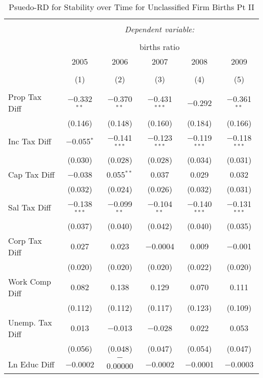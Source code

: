 
\begin{table}[!htbp] \centering 
  \caption{Psuedo-RD for Stability over Time for  Unclassified Firm Births Pt II} 
  \label{99year} 
\small 
\begin{tabular}{@{\extracolsep{5pt}}lccccc} 
\\[-1.8ex]\hline 
\hline \\[-1.8ex] 
 & \multicolumn{5}{c}{\textit{Dependent variable:}} \\ 
\cline{2-6} 
\\[-1.8ex] & \multicolumn{5}{c}{births ratio} \\ 
 & 2005 & 2006 & 2007 & 2008 & 2009 \\ 
\\[-1.8ex] & (1) & (2) & (3) & (4) & (5)\\ 
\hline \\[-1.8ex] 
 Prop Tax Diff & $-$0.332$^{**}$ & $-$0.370$^{**}$ & $-$0.431$^{***}$ & $-$0.292 & $-$0.361$^{**}$ \\ 
  & (0.146) & (0.148) & (0.160) & (0.184) & (0.166) \\ 
  Inc Tax Diff & $-$0.055$^{*}$ & $-$0.141$^{***}$ & $-$0.123$^{***}$ & $-$0.119$^{***}$ & $-$0.118$^{***}$ \\ 
  & (0.030) & (0.028) & (0.028) & (0.034) & (0.031) \\ 
  Cap Tax Diff & $-$0.038 & 0.055$^{**}$ & 0.037 & 0.029 & 0.032 \\ 
  & (0.032) & (0.024) & (0.026) & (0.032) & (0.031) \\ 
  Sal Tax Diff & $-$0.138$^{***}$ & $-$0.099$^{**}$ & $-$0.104$^{**}$ & $-$0.140$^{***}$ & $-$0.131$^{***}$ \\ 
  & (0.037) & (0.040) & (0.042) & (0.040) & (0.035) \\ 
  Corp Tax Diff & 0.027 & 0.023 & $-$0.0004 & 0.009 & $-$0.001 \\ 
  & (0.020) & (0.020) & (0.020) & (0.022) & (0.020) \\ 
  Work Comp Diff & 0.082 & 0.138 & 0.129 & 0.070 & 0.111 \\ 
  & (0.112) & (0.112) & (0.117) & (0.123) & (0.109) \\ 
  Unemp. Tax Diff & 0.013 & $-$0.013 & $-$0.028 & 0.022 & 0.053 \\ 
  & (0.056) & (0.048) & (0.047) & (0.054) & (0.047) \\ 
  Ln Educ Diff & $-$0.0002 & $-$0.00000 & $-$0.0002 & $-$0.0001 & $-$0.0003 \\ 

\end{tabular}
\end{table}
